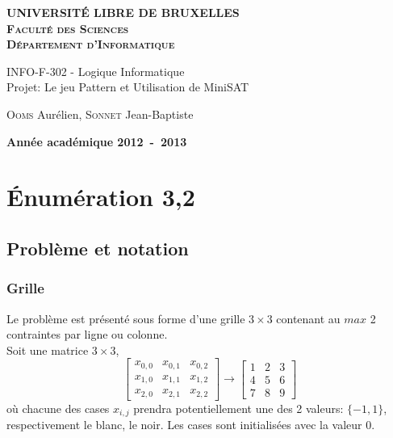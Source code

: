 \documentclass[a4paper,12pt]{report}
\begin{document}
\setlength\parindent{0pt} %


\begin{titlepage}
\begin{center}
\textbf{\textsc{UNIVERSIT\'E LIBRE DE BRUXELLES}}\\
\textbf{\textsc{Faculté des Sciences}}\\
\textbf{\textsc{Département d'Informatique}}
\vfill{}\vfill{}
\begin{center}{\Huge INFO-F-302 - Logique Informatique \\Projet: Le jeu Pattern et Utilisation de MiniSAT}\end{center}{\Huge \par}
\begin{center}{\large \textsc{Ooms} Aurélien, \textsc{Sonnet} Jean-Baptiste}\end{center}{\Huge \par}
\vfill{}\vfill{}
\vfill{}\vfill{}\enlargethispage{3cm}
\textbf{Année académique 2012~-~2013}
\end{center}
\end{titlepage}




\tableofcontents
\newpage


\chapter{Énumération 3,2}

\section{Problème et notation}
\subsection{Grille}
Le problème est présenté sous forme d'une grille $3\times3$ contenant au $max$ 2 contraintes par ligne ou colonne.\\

Soit une matrice $3\times3$,  
$$\begin{bmatrix} x_{0,0} & x_{0,1} & x_{0,2} \\ x_{1,0} & x_{1,1} & x_{1,2} \\ x_{2,0} & x_{2,1} & x_{2,2}\end{bmatrix} \rightarrow \begin{bmatrix} 1 & 2 & 3 \\ 4 & 5 & 6 \\ 7 & 8 & 9\end{bmatrix}$$ 
où chacune des cases $x_{i,j}$ prendra potentiellement une des 2 valeurs: 
$\{-1,1\}$, respectivement le blanc, le noir. Les cases sont initialisées avec la valeur $0$.\\
\end{document}
